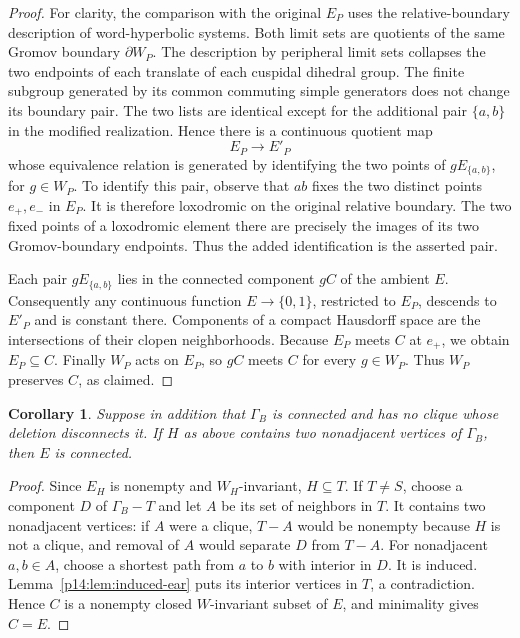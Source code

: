 \documentclass[11pt,reqno]{amsart}
\theoremstyle{plain}
\newtheorem{corollary}[theorem]{Corollary}
\theoremstyle{definition}
\theoremstyle{remark}
\numberwithin{equation}{section}
\begin{document}
\begin{proof}
For clarity, the comparison with the original $E_P$ uses the
relative-boundary description of word-hyperbolic systems. Both
limit sets are quotients of the same Gromov boundary $\partial W_P$.
The description by peripheral limit sets \cite{Tran} collapses the
two endpoints of each translate of each cuspidal dihedral group.
The finite subgroup generated by its common commuting simple
generators does not change its boundary pair. The two lists are
identical except for the additional pair $\{a,b\}$ in the
modified realization. Hence there is a continuous quotient map
\[
                         E_P\longrightarrow E'_P
\]
whose equivalence relation is generated by identifying the two
points of $gE_{\{a,b\}}$, for $g\in W_P$.
To identify this pair, observe that $ab$ fixes the two distinct
points $e_+,e_-$ in $E_P$. It is therefore loxodromic on the
original relative boundary. The two fixed points of a loxodromic
element there are precisely the images of its two Gromov-boundary
endpoints. Thus the added identification is the asserted pair.

Each pair $gE_{\{a,b\}}$ lies in the connected component $gC$
of the ambient $E$. Consequently any continuous function
$E\to\{0,1\}$, restricted to $E_P$, descends to $E'_P$ and is
constant there. Components of a compact Hausdorff space are the
intersections of their clopen neighborhoods. Because $E_P$ meets
$C$ at $e_+$, we obtain $E_P\subseteq C$. Finally $W_P$ acts
on $E_P$, so $gC$ meets $C$ for every $g\in W_P$. Thus $W_P$
preserves $C$, as claimed.
\end{proof}

\begin{corollary}\label{p14:cor:atom-propagation}
Suppose in addition that $\Gamma_B$ is connected and has no
clique whose deletion disconnects it. If $H$ as above contains
two nonadjacent vertices of $\Gamma_B$, then $E$ is connected.
\end{corollary}

\begin{proof}
Since $E_H$ is nonempty and $W_H$-invariant, $H\subseteq T$.
If $T\ne S$, choose a component $D$ of $\Gamma_B-T$ and let
$A$ be its set of neighbors in $T$. It contains two nonadjacent
vertices: if $A$ were a clique, $T-A$ would be nonempty because
$H$ is not a clique, and removal of $A$ would separate $D$ from
$T-A$. For nonadjacent $a,b\in A$, choose a shortest path
from $a$ to $b$ with interior in $D$. It is induced.
Lemma~\ref{p14:lem:induced-ear} puts its interior vertices in $T$,
a contradiction. Hence $C$ is a nonempty closed $W$-invariant
subset of $E$, and minimality \cite{DHR} gives $C=E$.
\end{proof}
\end{document}
